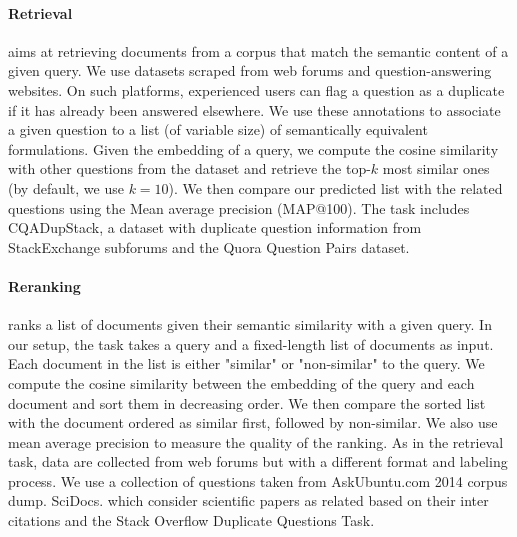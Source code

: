 \paragraph{Retrieval} aims at retrieving documents from a corpus that match the semantic content of a given query. We use datasets scraped from web forums and question-answering websites. On such platforms, experienced users can flag a question as a duplicate if it has already been answered elsewhere. We use these annotations to associate a given question to a list (of variable size) of semantically equivalent formulations. Given the embedding of a query, we compute the cosine similarity with other questions from the dataset and retrieve the top-$k$ most similar ones (by default, we use $k=10$). We then compare our predicted list with the related questions using the Mean average precision (MAP@100). The task includes CQADupStack, a dataset with duplicate question information from StackExchange subforums and the Quora Question Pairs dataset.

\paragraph{Reranking} ranks a list of documents given their semantic similarity with a given query. In our setup, the task takes a query and a fixed-length list of documents as input. Each document in the list is either "similar" or "non-similar" to the query. We compute the cosine similarity between the embedding of the query and each document and sort them in decreasing order. We then compare the sorted list with the document ordered as similar first, followed by non-similar. We also use mean average precision to measure the quality of the ranking. As in the retrieval task, data are collected from web forums but with a different format and labeling process. We use a collection of questions taken from AskUbuntu.com 2014 corpus dump. SciDocs. which consider scientific papers as related based on their inter citations  and the Stack Overflow Duplicate Questions Task.

